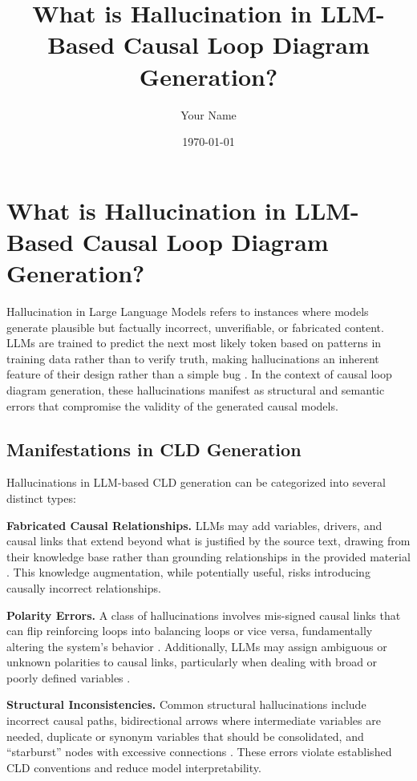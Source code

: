 \documentclass[12pt,a4paper]{article}
\title{What is Hallucination in LLM-Based Causal Loop Diagram Generation?}
\author{Your Name}
\date{\today}
\begin{document}
\maketitle

\section{What is Hallucination in LLM-Based Causal Loop Diagram Generation?}

Hallucination in Large Language Models refers to instances where models generate plausible but factually incorrect, unverifiable, or fabricated content. LLMs are trained to predict the next most likely token based on patterns in training data rather than to verify truth, making hallucinations an inherent feature of their design rather than a simple bug \parencite{masterofcode2023}. In the context of causal loop diagram generation, these hallucinations manifest as structural and semantic errors that compromise the validity of the generated causal models.

\subsection{Manifestations in CLD Generation}

Hallucinations in LLM-based CLD generation can be categorized into several distinct types:

\textbf{Fabricated Causal Relationships.} LLMs may add variables, drivers, and causal links that extend beyond what is justified by the source text, drawing from their knowledge base rather than grounding relationships in the provided material \parencite{pipeline2025}. This knowledge augmentation, while potentially useful, risks introducing causally incorrect relationships.

\textbf{Polarity Errors.} A class of hallucinations involves mis-signed causal links that can flip reinforcing loops into balancing loops or vice versa, fundamentally altering the system's behavior \parencite{pipeline2025}. Additionally, LLMs may assign ambiguous or unknown polarities to causal links, particularly when dealing with broad or poorly defined variables \parencite{pipeline2025}.

\textbf{Structural Inconsistencies.} Common structural hallucinations include incorrect causal paths, bidirectional arrows where intermediate variables are needed, duplicate or synonym variables that should be consolidated, and ``starburst'' nodes with excessive connections \parencite{pipeline2025}. These errors violate established CLD conventions and reduce model interpretability.
\end{document}
